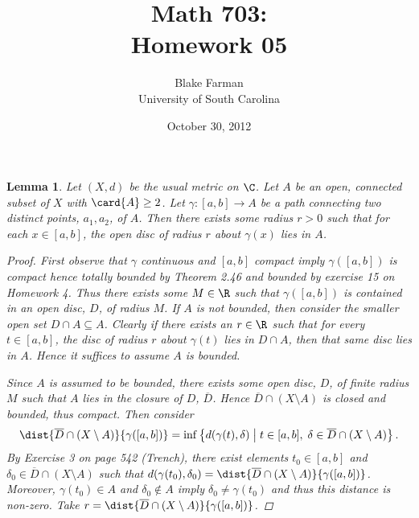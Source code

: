 \documentclass[12pt]{amsart}
\author{Blake Farman\\University of South Carolina}
\title{Math 703:\\Homework 05}
\date{October 30, 2012}
\begin{document}
\maketitle

\newtheorem{setup}{}
\setcounter{setup}{16}
\newtheorem{ex}{}[setup]
\newtheorem{lem}{Lemma}
\theoremstyle{definition}
\newtheorem{defn}{Definition}

\begin{lem}\label{min-radius}
  Let $(X,d)$ be the usual metric on $\C$.  Let $A$ be an open, connected subset of $X$ with $\card{A} \geq 2$.
  Let $\gamma \colon [a, b] \rightarrow A$ be a path connecting two distinct points, $a_1, a_2$, of $A$.
  Then there exists some radius $r > 0$ such that for each $x \in [a,b]$, the open disc of radius $r$ about $\gamma(x)$ lies in $A$.
  
  \begin{proof}
    First observe that $\gamma$ continuous and $[a,b]$  compact imply $\gamma([a,b])$ is compact hence totally bounded by Theorem 2.46 and bounded by exercise 15 on Homework 4.
    Thus there exists some $M \in \R$ such that $\gamma([a,b])$ is contained in an open disc, $D$, of radius $M$.
    If $A$ is not bounded, then consider the smaller open set $D \cap A \subseteq A$.
    Clearly if there exists an $r \in \R$ such that for every $t \in [a,b]$, the disc of radius $r$ about $\gamma(t)$ lies in $D \cap A$, then that same disc lies in $A$.
    Hence it suffices to assume $A$ is bounded.
    
    Since $A$ is assumed to be bounded, there exists some open disc, $D$, of finite radius $M$ such that $A$ lies in the closure of $D$, $\overline{D}$.
    Hence $\overline{D} \cap (X \setminus A)$ is closed and bounded, thus compact.
    Then consider $$\dist{\overline{D} \cap (X \setminus{A})}{\gamma([a,b])} = \inf \left\{d(\gamma(t),\delta) \;\middle\vert\; t \in [a,b],\; \delta \in \overline{D} \cap (X \setminus{A})\right\}.$$
    By Exercise 3 on page 542 (Trench), there exist elements $t_0 \in [a,b]$ and $\delta_0 \in \overline{D} \cap (X \setminus{A})$ such that $d(\gamma(t_0),\delta_0) = \dist{\overline{D} \cap (X \setminus{A})}{\gamma([a,b])}$.
    Moreover, $\gamma(t_0) \in A$ and $\delta_0 \not \in A$ imply $\delta_0 \not = \gamma(t_0)$ and thus this distance is non-zero.
    Take $r = \dist{\overline{D} \cap (X \setminus{A})}{\gamma([a,b])}$.
  \end{proof}
\end{lem}
\end{document}
